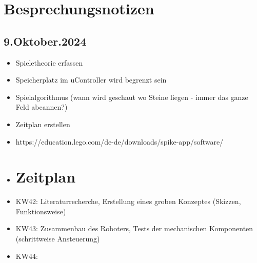 \chapter*{Besprechungsnotizen}

\section{9.Oktober.2024}

\begin{itemize}
	\item Spieletheorie erfassen
	\item Speicherplatz im uController wird begrenzt sein
	\item Spielalgorithmus (wann wird geschaut wo Steine liegen - immer das ganze Feld abcannen?)
	\item Zeitplan erstellen
	\item  https://education.lego.com/de-de/downloads/spike-app/software/
	\item 
	\chapter*{Zeitplan}
	\item KW42: Literaturrecherche, Erstellung eines groben Konzeptes (Skizzen, Funktionsweise)
	\item KW43: Zusammenbau des Roboters, Tests der mechanischen Komponenten (schrittweise Ansteuerung)
	\item KW44: 
	
\end{itemize}
